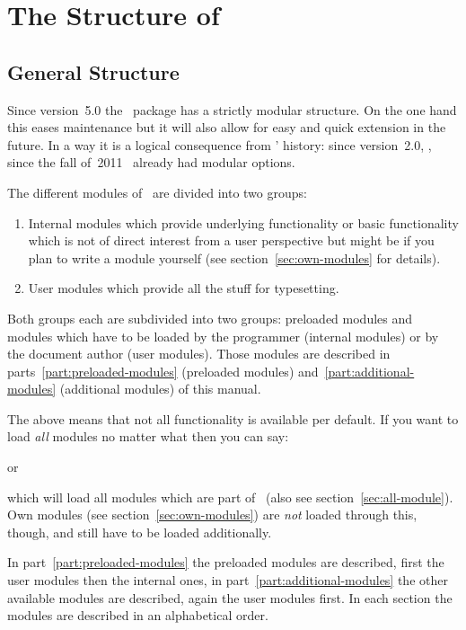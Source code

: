 \documentclass[load-preamble+]{cnltx-doc}
\begin{document}
\section{The Structure of \chemmacros}\label{sec:structure-chemmacros}
\subsection{General Structure}
Since version~5.0 the \chemmacros\ package has a strictly modular
structure.  On the one hand this eases maintenance but it
will also allow for easy and quick extension in the future.  In a way it is a
logical consequence from \chemmacros' history: since version~2.0, \ie, since
the fall of~2011 \chemmacros\ already had modular options.

The different modules of \chemmacros\ are divided into two groups:
\begin{enumerate}
  \item Internal modules which provide underlying functionality or basic
    functionality which is not of direct interest from a user perspective but
    might be if you plan to write a module yourself (see
    section~\ref{sec:own-modules} for details).
  \item User modules which provide all the stuff for typesetting.
\end{enumerate}
Both groups each are subdivided into two groups: preloaded modules and modules
which have to be loaded by the programmer (internal modules) or by the
document author (user modules).  Those modules are described in
parts~\ref{part:preloaded-modules} (preloaded modules)
and~\ref{part:additional-modules} (additional modules) of this manual.

The above means that not all functionality is available per default.  If you
want to load \emph{all} modules no matter what then you can say:
\begin{sourcecode}
\end{sourcecode}
or
\begin{sourcecode}
\end{sourcecode}
which will load all modules which are part of \chemmacros\ (also see
section~\vref{sec:all-module}). Own modules (see
section~\vref{sec:own-modules}) are \emph{not} loaded through this, though,
and still have to be loaded additionally.

In part~\vref{part:preloaded-modules} the preloaded modules are described,
first the user modules then the internal ones, in
part~\vref{part:additional-modules} the other available modules are described,
again the user modules first.  In each section the modules are described in
an alphabetical order.
\end{document}
